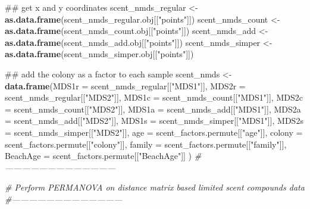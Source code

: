 \documentclass[]{article}
\newenvironment{Shaded}{\begin{snugshade}}{\end{snugshade}}
\newcommand{\KeywordTok}[1]{\textcolor[rgb]{0.13,0.29,0.53}{\textbf{#1}}}
\newcommand{\DataTypeTok}[1]{\textcolor[rgb]{0.13,0.29,0.53}{#1}}
\newcommand{\StringTok}[1]{\textcolor[rgb]{0.31,0.60,0.02}{#1}}
\newcommand{\CommentTok}[1]{\textcolor[rgb]{0.56,0.35,0.01}{\textit{#1}}}
\newcommand{\NormalTok}[1]{#1}
\begin{document}
\begin{Shaded}
\begin{Highlighting}[]
{{{{{\NormalTok{    ## get x and y coordinates}
\NormalTok{    scent_nmds_regular <-}\StringTok{ }\KeywordTok{as.data.frame}\NormalTok{(scent_nmds_regular.obj[[}\StringTok{"points"}\NormalTok{]])}
\NormalTok{    scent_nmds_count <-}\StringTok{ }\KeywordTok{as.data.frame}\NormalTok{(scent_nmds_count.obj[[}\StringTok{"points"}\NormalTok{]]) }
\NormalTok{    scent_nmds_add <-}\StringTok{ }\KeywordTok{as.data.frame}\NormalTok{(scent_nmds_add.obj[[}\StringTok{"points"}\NormalTok{]])}
\NormalTok{    scent_nmds_simper <-}\StringTok{ }\KeywordTok{as.data.frame}\NormalTok{(scent_nmds_simper.obj[[}\StringTok{"points"}\NormalTok{]])}
    
\NormalTok{    ## add the colony as a factor to each sample}
\NormalTok{    scent_nmds <-}\StringTok{ }\KeywordTok{data.frame}\NormalTok{(}\DataTypeTok{MDS1r =}\NormalTok{ scent_nmds_regular[[}\StringTok{"MDS1"}\NormalTok{]],}
                             \DataTypeTok{MDS2r =}\NormalTok{ scent_nmds_regular[[}\StringTok{"MDS2"}\NormalTok{]],}
                             \DataTypeTok{MDS1c =}\NormalTok{ scent_nmds_count[[}\StringTok{"MDS1"}\NormalTok{]],}
                             \DataTypeTok{MDS2c =}\NormalTok{ scent_nmds_count[[}\StringTok{"MDS2"}\NormalTok{]],}
                             \DataTypeTok{MDS1a =}\NormalTok{ scent_nmds_add[[}\StringTok{"MDS1"}\NormalTok{]],}
                             \DataTypeTok{MDS2a =}\NormalTok{ scent_nmds_add[[}\StringTok{"MDS2"}\NormalTok{]],}
                             \DataTypeTok{MDS1s =}\NormalTok{ scent_nmds_simper[[}\StringTok{"MDS1"}\NormalTok{]],}
                             \DataTypeTok{MDS2s =}\NormalTok{ scent_nmds_simper[[}\StringTok{"MDS2"}\NormalTok{]], }
                             \DataTypeTok{age =}\NormalTok{ scent_factors.permute[[}\StringTok{"age"}\NormalTok{]],}
                             \DataTypeTok{colony =}\NormalTok{ scent_factors.permute[[}\StringTok{"colony"}\NormalTok{]],}
                             \DataTypeTok{family =}\NormalTok{ scent_factors.permute[[}\StringTok{"family"}\NormalTok{]],}
                             \DataTypeTok{BeachAge =}\NormalTok{ scent_factors.permute[[}\StringTok{"BeachAge"}\NormalTok{]]}
\NormalTok{    )}
    \CommentTok{#---------------------------------------}
    
    \CommentTok{# Perform PERMANOVA on distance matrix based limited scent compounds data}
    \CommentTok{#---------------------------------------}
    
}}}}}
\end{Highlighting}
\end{Shaded}
\end{document}
